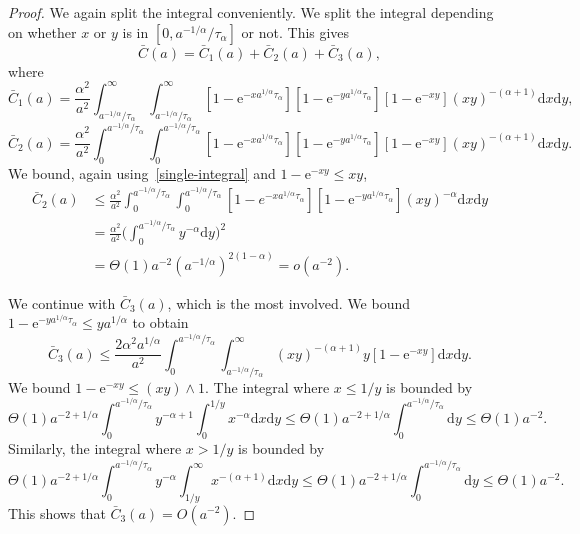 \documentclass[ twocolumn,
 amsmath,amssymb,
 aps, pre, amsthm, amsfonts,
]{revtex4-2}
\newcommand{\e}{\mathrm{e}}
\newcommand{\nn}{\nonumber}
\begin{document}
\begin{proof}
    We again split the integral conveniently. We split the integral depending on whether $x$ or $y$ is in $[0,a^{-1/\alpha}/{\tau_\alpha}]$ or not. This gives
    \begin{equation}
        \bar{C}(a)=\bar{C}_1(a)+\bar{C}_2(a)+\bar{C}_3(a),
    \end{equation}
where
\begin{equation}
    \bar{C}_1(a)=\frac{\alpha^2}{a^2} \int_{a^{-1/\alpha}/{\tau_\alpha}}^{\infty} \int_{a^{-1/\alpha}/{\tau_\alpha}}^{\infty}[1-\e^{-xa^{1/\alpha} {\tau_\alpha}}][1-\e^{-ya^{1/\alpha} {\tau_\alpha}}][1-\e^{-xy}](xy)^{-(\alpha+1)}
	{\mathrm d}x {\mathrm d}y,
\end{equation}
\begin{equation}
	\bar{C}_2(a)=\frac{\alpha^2}{a^2} \int_0^{a^{-1/\alpha}/{\tau_\alpha}}\int_0^{a^{-1/\alpha}/{\tau_\alpha}}[1-\e^{-xa^{1/\alpha} {\tau_\alpha}}][1-\e^{-ya^{1/\alpha} {\tau_\alpha}}][1-\e^{-xy}](xy)^{-(\alpha+1)}
	{\mathrm d}x {\mathrm d}y.
\end{equation}
We bound, again using~\eqref{single-integral} and $1-\e^{-xy}\leq xy$,
\begin{align}
    \bar{C}_2(a)& \leq \frac{\alpha^2}{a^2}\int_{0}^{a^{-1/\alpha}/{\tau_\alpha}} \int_{0}^{a^{-1/\alpha}/{\tau_\alpha}} [1-e^{-xa^{1/\alpha} {\tau_\alpha}}][1-\e^{-ya^{1/\alpha} {\tau_\alpha}}](xy)^{-\alpha}
	{\mathrm d}x {\mathrm d}y\\
	&=\frac{\alpha^2}{a^2} \Big(\int_{0}^{a^{-1/\alpha}/{\tau_\alpha}} y^{-\alpha}
	{\mathrm d}y\Big)^2\nn\\
    &=\Theta(1)a^{-2}(a^{-1/\alpha})^{2(1-\alpha)}=o(a^{-2}).\nn
\end{align}
\smallskip

We continue with $\bar{C}_3(a)$, which is the most involved. We bound $1-\e^{-ya^{1/\alpha} {\tau_\alpha}}\leq ya^{1/\alpha}$ to obtain
\begin{equation}
    \bar{C}_3(a)\leq \frac{2\alpha^2 a^{1/\alpha}}{a^2}\int_{0}^{a^{-1/\alpha}/{\tau_\alpha}} \int_{a^{-1/\alpha}/{\tau_\alpha}}^\infty
	(xy)^{-(\alpha+1)} y [1-\e^{-xy}]
	{\mathrm d}x {\mathrm d}y.
\end{equation}
We bound $1-\e^{-xy}\leq (xy)\wedge 1$. The integral where $x\leq 1/y$ is bounded by
\begin{equation}
    \Theta(1) a^{-2+1/\alpha}
	\int_{0}^{a^{-1/\alpha}/{\tau_\alpha}} y^{-\alpha+1} \int_{0}^{1/y}
	x^{-\alpha}
	{\mathrm d}x {\mathrm d}y \leq \Theta(1)a^{-2+1/\alpha} \int_{0}^{a^{-1/\alpha}/{\tau_\alpha}} {\mathrm d}y\leq \Theta(1)a^{-2}.
\end{equation}
Similarly, the integral where $x>1/y$ is bounded by
\begin{equation}
    \Theta(1) a^{-2+1/\alpha}
	\int_{0}^{a^{-1/\alpha}/{\tau_\alpha}} y^{-\alpha} \int_{1/y}^{\infty}
	x^{-(\alpha+1)}
	{\mathrm d}x {\mathrm d}y\leq \Theta(1)a^{-2+1/\alpha} \int_{0}^{a^{-1/\alpha}/{\tau_\alpha}}{\mathrm d}y\leq \Theta(1)a^{-2}.
\end{equation}
This shows that $\bar{C}_3(a)=O(a^{-2})$.
\smallskip


\end{proof}
\end{document}
